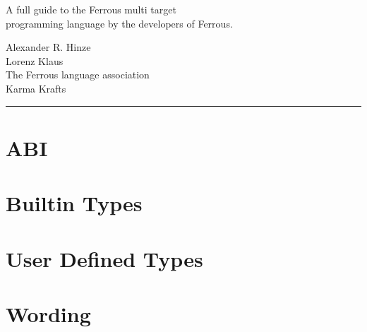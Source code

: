 \documentclass[11pt]{article}
\begin{document}
\begin{titlepage}
{{{{                        \vspace{0.7cm} %
                    }
                }
            }
        }
        \setlength{\fboxrule}{1pt}

        \begin{center}
            \fontsize{16}{0} \selectfont
            A full guide to the Ferrous multi target\\
            programming language by the developers of Ferrous.
            \normalfont \selectfont
        \end{center}

        \vfill %

        \parbox[t]{0.93 \textwidth}{ %
            \raggedleft %
            \large %
            {\Large Alexander R. Hinze}\\[4pt] %
            {\Large Lorenz Klaus}\\[4pt] %
            The Ferrous language association\\
            Karma Krafts

            \hfill \rule {0.2 \linewidth}{1pt} %
        }
    \end{titlepage}

    \tableofcontents \newpage


    \section{ABI} \label{sec:abi}
    
    \newpage


    \section{Builtin Types} \label{sec:builtin-types}
    
    \newpage


    \section{User Defined Types} \label{sec:user-defined-types}
    
    \newpage


    \section{Wording} \label{sec:wording}
    
    \newpage
\end{document}
